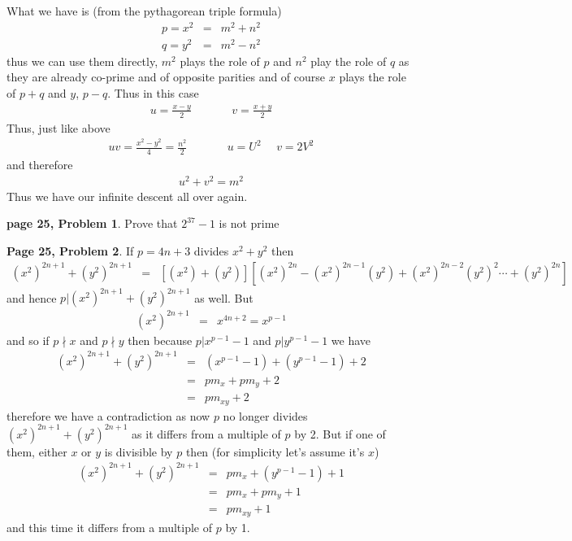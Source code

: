 \documentclass[aps,preprint,preprintnumbers,nofootinbib,showpacs,prd]{revtex4-1}
\newcommand{\nbea}{\begin{eqnarray*}}
\newcommand{\neea}{\end{eqnarray*}}
\begin{document}
What we have is (from the pythagorean triple formula)
%
\nbea
p = x^2 & = & m^2 + n ^2 \\
q = y^2 & = & m^2 - n^2
\neea
%
thus we can use them directly, $m^2$ plays the role of $p$ and $n^2$ play the role of $q$ as they are already co-prime and of opposite parities and of course $x$ plays the role of $p+q$ and $y$, $p-q$. Thus in this case
%
\nbea
u = \frac{x-y}{2} ~~~~~~~~~~~~~~~~ v = \frac{x+y}{2}
\neea
%
Thus, just like above
%
\nbea
uv = \frac{x^2 - y^2}{4} = \frac{n^2}{2} ~~~~~~~~~~~~~~~~ u = U^2 ~~~~~~ v = 2V^2
\neea
%
and therefore
%
\nbea
u^2 + v^2 = m^2
\neea
%
Thus we have our infinite descent all over again.












{\bf page 25, Problem 1}. Prove that $2^{37}-1$ is not prime














{\bf Page 25, Problem 2}. If $p = 4n+3$ divides $x^2 + y^2$ then
%
\nbea
(x^2)^{2n+1} + (y^2)^{2n+1} & = & \left\lbrack (x^2) + (y^2) \right\rbrack \left\lbrack (x^2)^{2n} - (x^2)^{2n-1}(y^2)  +(x^2)^{2n-2}(y^2)^2 \cdots + (y^2)^{2n} \right\rbrack
\neea
%
and hence $p|(x^2)^{2n+1} + (y^2)^{2n+1}$ as well. But
%
\nbea
(x^2)^{2n+1} & = & x^{4n+2} = x^{p-1}
\neea
%
and so if $p\nmid x$ and $p\nmid y$ then because $p|x^{p-1} - 1$ and $p|y^{p-1} - 1$ we have
%
\nbea
(x^2)^{2n+1} + (y^2)^{2n+1} & = & (x^{p-1} - 1) + (y^{p-1} - 1) + 2 \\
& = & pm_x + pm_y + 2 \\
& = & pm_{xy} + 2
\neea
%
therefore we have a contradiction as now $p$ no longer divides $(x^2)^{2n+1} + (y^2)^{2n+1}$ as it differs from a multiple of $p$ by 2. But if one of them, either $x$ or $y$ is divisible by $p$ then (for simplicity let's assume it's $x$)
%
\nbea
(x^2)^{2n+1} + (y^2)^{2n+1} & = & pm_x + (y^{p-1} - 1) + 1 \\
& = & pm_x + pm_y + 1 \\
& = & pm_{xy} + 1
\neea
%
and this time it differs from a multiple of $p$ by 1.
\end{document}
